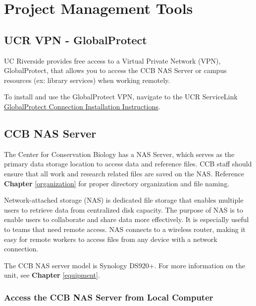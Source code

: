 \documentclass[
]{book}
\begin{document}
\hypertarget{projmgmt}{%
\chapter{Project Management Tools}\label{projmgmt}}

\hypertarget{ucr-vpn---globalprotect}{%
\section{UCR VPN - GlobalProtect}\label{ucr-vpn---globalprotect}}

UC Riverside provides free access to a Virtual Private Network (VPN), GlobalProtect, that allows you to access the CCB NAS Server or campus resources (ex: library services) when working remotely.

To install and use the GlobalProtect VPN, navigate to the UCR ServiceLink \href{https://ucrsupport.service-now.com/ucr_portal/?id=kb_article\&sys_id=8a264d791b5f0c149c0b844fdd4bcb34}{GlobalProtect Connection Installation Instructions}.

\hypertarget{ccb-nas-server}{%
\section{CCB NAS Server}\label{ccb-nas-server}}

The Center for Conservation Biology has a NAS Server, which serves as the primary data storage location to access data and reference files. CCB staff should ensure that all work and research related files are saved on the NAS. Reference \textbf{Chapter} \ref{organization} for proper directory organization and file naming.

Network-attached storage (NAS) is dedicated file storage that enables multiple users to retrieve data from centralized disk capacity. The purpose of NAS is to enable users to collaborate and share data more effectively. It is especially useful to teams that need remote access. NAS connects to a wireless router, making it easy for remote workers to access files from any device with a network connection.

The CCB NAS server model is Synology DS920+. For more information on the unit, see \textbf{Chapter} \ref{equipment}.

\hypertarget{access-the-ccb-nas-server-from-local-computer}{%
\subsection{Access the CCB NAS Server from Local Computer}\label{access-the-ccb-nas-server-from-local-computer}}
\end{document}

